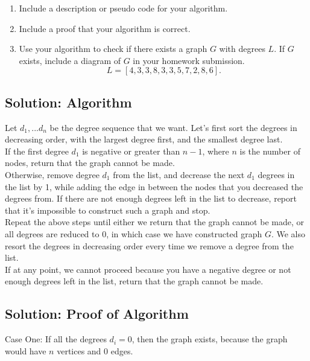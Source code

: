 \documentclass[letter,11pt]{article}
\begin{document}
\begin{enumerate}
\item Include a description or pseudo code for your algorithm.

\item Include a proof that your algorithm is correct.

\item Use your algorithm to check if there exists a graph $G$ with degrees $L$.  If $G$ exists, include a diagram of $G$ in your homework submission.
\[ L = [ 4, 3, 3, 8, 3, 3, 5, 7, 2, 8, 6 ]. \]
\end{enumerate}

\subsection{Solution: Algorithm}

Let $d_1,...d_n$ be the degree sequence that we want. Let's first sort the degrees in decreasing order, with the largest degree first, and the smallest degree last. \\

If the first degree $d_1$ is negative or greater than $n-1$, where $n$ is the number of nodes, return that the graph cannot be made. \\

Otherwise, remove degree $d_1$ from the list, and decrease the next $d_1$ degrees in the list by 1, while adding the edge in between the nodes that you decreased the degrees from. If there are not enough degrees left in the list to decrease, report that it's impossible to construct such a graph and stop.\\

Repeat the above steps until either we return that the graph cannot be made, or all degrees are reduced to $0$, in which case we have constructed graph $G$. We also resort the degrees in decreasing order every time we remove a degree from the list.\\

If at any point, we cannot proceed because you have a negative degree or not enough degrees left in the list, return that the graph cannot be made.

\subsection{Solution: Proof of Algorithm}

\indent \indent Case One: If all the degrees $d_i = 0$, then the graph exists, because the graph would have $n$ vertices and $0$ edges.
\end{document}

